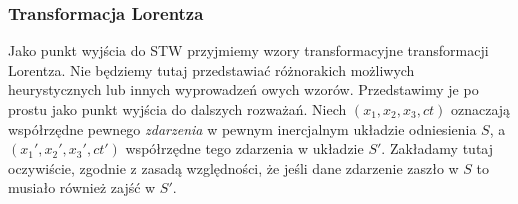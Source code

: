 \documentclass[../main.tex]{subfiles}
\begin{document}
\subsubsection{Transformacja Lorentza}
Jako punkt wyjścia do STW przyjmiemy wzory transformacyjne transformacji Lorentza. Nie będziemy tutaj przedstawiać różnorakich możliwych heurystycznych lub innych wyprowadzeń owych wzorów. Przedstawimy je po prostu jako punkt wyjścia do dalszych rozważań. Niech \((x_1,x_2,x_3,ct)\) oznaczają współrzędne pewnego \textit{zdarzenia} w pewnym inercjalnym układzie odniesienia \(S\), a \((x_1',x_2',x_3',ct')\) współrzędne tego zdarzenia w układzie \(S'\). Zakładamy tutaj oczywiście, zgodnie z zasadą względności, że jeśli dane zdarzenie zaszło w \(S\) to musiało również zajść w \(S'\).\\
\end{document}
